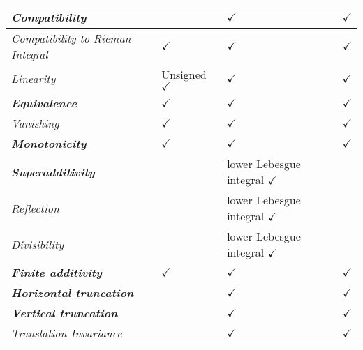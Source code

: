 \documentclass[11pt]{article}
\begin{document}
\begin{table}[h!]
\begin{tabularx}{1\textwidth} { 
  | >{\raggedright\arraybackslash} m{3cm}
  | >{\centering\arraybackslash}X
  | >{\centering\arraybackslash}X
  | >{\centering\arraybackslash}X  | }
 \hline \vspace{5pt}
\emph{Compatibility} \vspace{2pt}  &    & $\checkmark$  & $\checkmark$    \\
 \hline \vspace{5pt}
\emph{Compatibility to Rieman Integral} \vspace{2pt}  &  $\checkmark$  & $\checkmark$  & $\checkmark$    \\
\hline \vspace{5pt}
\emph{Linearity}  \vspace{2pt}  &  Unsigned $\checkmark$  & $\checkmark$  & $\checkmark$    \\
\hline \vspace{5pt}
\emph{\textbf{Equivalence}} \vspace{2pt}   & $\checkmark$  & $\checkmark$  & $\checkmark$    \\
\hline \vspace{5pt}
\emph{Vanishing} \vspace{2pt}   &   $\checkmark$  & $\checkmark$  & $\checkmark$  \\
\hline \vspace{5pt}
\emph{\textbf{Monotonicity}} \vspace{2pt}   & $\checkmark$    &  $\checkmark$   & $\checkmark$  \\
\hline \vspace{5pt}
\emph{\textbf{Superadditivity}} \vspace{2pt}   & & lower Lebesgue integral $\checkmark$  &    \\
\hline \vspace{5pt}
\emph{Reflection} \vspace{2pt}   & &  lower Lebesgue integral $\checkmark$  &    \\
\hline \vspace{5pt}
\emph{Divisibility} \vspace{2pt}   & &  lower Lebesgue integral $\checkmark$  &    \\
\hline \vspace{5pt}
\emph{\textbf{Finite additivity}} \vspace{2pt}   & $\checkmark$ & $\checkmark$ & $\checkmark$     \\
\hline \vspace{5pt}
\emph{\textbf{Horizontal truncation}} \vspace{2pt}   &   & $\checkmark$  & $\checkmark$     \\
\hline \vspace{5pt}
\emph{\textbf{Vertical truncation}} \vspace{2pt}   &   & $\checkmark$  & $\checkmark$     \\
\hline \vspace{5pt}
\emph{Translation Invariance} \vspace{2pt}   &   & $\checkmark$ & $\checkmark$    \\
\hline
\end{tabularx}
\end{table}
\end{document}
